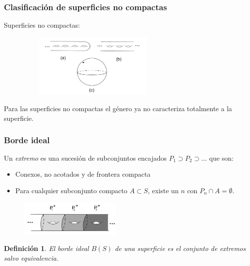 \documentclass{beamer}
\newtheorem*{defi}{Definición}
\begin{document}
\begin{frame}
\frametitle{Clasificación de superficies no compactas}

Superficies no compactas:
\begin{figure}[htb]
\begin{center}
\includegraphics[width=3in,height=1.25in]{imagenes/ejemplonocompactas.png} 
\end{center}
\end{figure}

Para las superficies no compactas el género ya no caracteriza totalmente a la superficie.

\end{frame}

\begin{frame}
\frametitle{Borde ideal}
Un \textit{extremo} es una sucesión de subconjuntos encajados $P_1 \supset P_2 \supset ...$ que son:
\begin{itemize}
\item Conexos, no acotados y de frontera compacta
\item Para cualquier subconjunto compacto $A\subset S$, existe un $n$ con $P_n \cap A = \emptyset$.
\end{itemize}

\begin{figure}[htb]
\begin{center}
\includegraphics[width=2in,height=0.7in]{imagenes/final.png} 
\end{center}
\end{figure}

\begin{defi}
El borde ideal $B(S)$ de una superficie es el conjunto de extremos salvo equivalencia.
\end{defi}

\end{frame}
\end{document}

